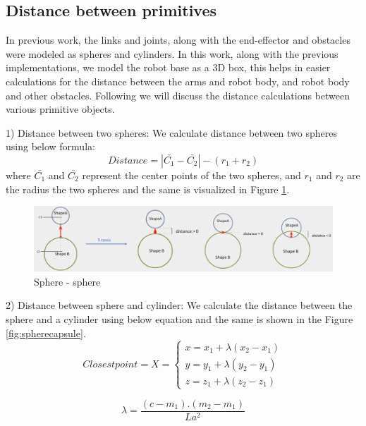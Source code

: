 \documentclass[a4paper, 11.5pt, conference]{ieeeconf}      %
\begin{document}
\subsection{Distance between primitives}
In previous work, the links and joints, along with the end-effector and obstacles were modeled as spheres and cylinders. In this work, along with the previous implementations, we model the robot base as a 3D box, this helps in easier calculations for the distance between the arms and robot body, and robot body and other obstacles. Following we will discuss the distance calculations between various primitive objects.

1) Distance between two spheres:
We calculate distance between two spheres using below formula:
\begin{equation}
	Distance = |\bar{C_1}-\bar{C_2}| - (r_1 + r_2)
\end{equation}
where $\bar{C_1}$ and $\bar{C_2}$ represent the center points of the two spheres, and $r_1$ and $r_2$ are the radius the two spheres and the same is visualized in Figure \ref{fig:sphere_sphere}.

\begin{figure}[H]
    \centering
    \includegraphics[scale=0.23]{images/sphere_sphere.png}
    \caption{Sphere - sphere}
    \label{fig:sphere_sphere}
\end{figure}

2) Distance between sphere and cylinder:
We calculate the distance between the sphere and a cylinder using below equation and the same is shown in the Figure \ref{fig:spherecapsule}.
\begin{equation}
	Closest point = X = 	\begin{cases}
        x = x_1 + \lambda(x_2 - x_1) \\
        y = y_1 + \lambda(y_2 - y_1) \\
        z = z_1 + \lambda(z_2 - z_1) 
    \end{cases}
    \label{eq:cpcyl}
\end{equation}

\begin{equation}
	\lambda = \frac{(c-m_1).(m_2-m_1)}{La^2}
\end{equation}
\end{document}
